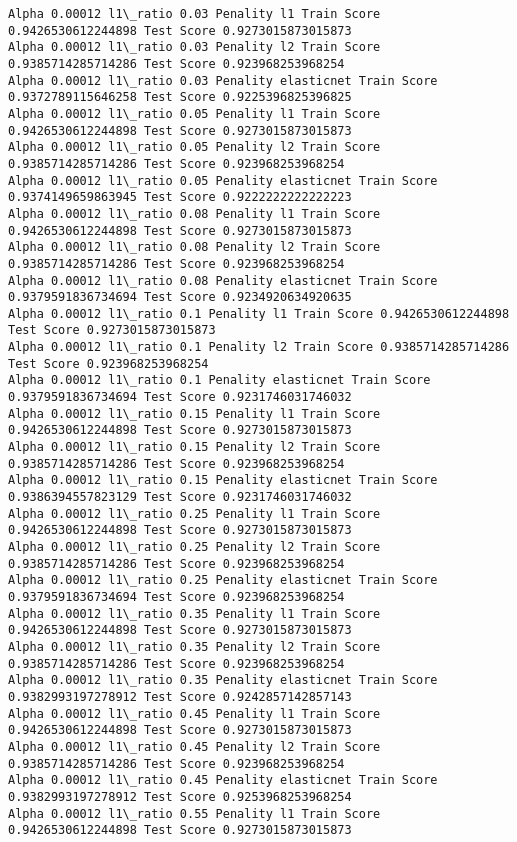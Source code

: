 \documentclass[11pt]{article}
\begin{document}
\begin{Verbatim}[commandchars=\\\{\}]
Alpha 0.00012 l1\_ratio 0.03 Penality l1 Train Score 0.9426530612244898 Test Score 0.9273015873015873
Alpha 0.00012 l1\_ratio 0.03 Penality l2 Train Score 0.9385714285714286 Test Score 0.923968253968254
Alpha 0.00012 l1\_ratio 0.03 Penality elasticnet Train Score 0.9372789115646258 Test Score 0.9225396825396825
Alpha 0.00012 l1\_ratio 0.05 Penality l1 Train Score 0.9426530612244898 Test Score 0.9273015873015873
Alpha 0.00012 l1\_ratio 0.05 Penality l2 Train Score 0.9385714285714286 Test Score 0.923968253968254
Alpha 0.00012 l1\_ratio 0.05 Penality elasticnet Train Score 0.9374149659863945 Test Score 0.9222222222222223
Alpha 0.00012 l1\_ratio 0.08 Penality l1 Train Score 0.9426530612244898 Test Score 0.9273015873015873
Alpha 0.00012 l1\_ratio 0.08 Penality l2 Train Score 0.9385714285714286 Test Score 0.923968253968254
Alpha 0.00012 l1\_ratio 0.08 Penality elasticnet Train Score 0.9379591836734694 Test Score 0.9234920634920635
Alpha 0.00012 l1\_ratio 0.1 Penality l1 Train Score 0.9426530612244898 Test Score 0.9273015873015873
Alpha 0.00012 l1\_ratio 0.1 Penality l2 Train Score 0.9385714285714286 Test Score 0.923968253968254
Alpha 0.00012 l1\_ratio 0.1 Penality elasticnet Train Score 0.9379591836734694 Test Score 0.9231746031746032
Alpha 0.00012 l1\_ratio 0.15 Penality l1 Train Score 0.9426530612244898 Test Score 0.9273015873015873
Alpha 0.00012 l1\_ratio 0.15 Penality l2 Train Score 0.9385714285714286 Test Score 0.923968253968254
Alpha 0.00012 l1\_ratio 0.15 Penality elasticnet Train Score 0.9386394557823129 Test Score 0.9231746031746032
Alpha 0.00012 l1\_ratio 0.25 Penality l1 Train Score 0.9426530612244898 Test Score 0.9273015873015873
Alpha 0.00012 l1\_ratio 0.25 Penality l2 Train Score 0.9385714285714286 Test Score 0.923968253968254
Alpha 0.00012 l1\_ratio 0.25 Penality elasticnet Train Score 0.9379591836734694 Test Score 0.923968253968254
Alpha 0.00012 l1\_ratio 0.35 Penality l1 Train Score 0.9426530612244898 Test Score 0.9273015873015873
Alpha 0.00012 l1\_ratio 0.35 Penality l2 Train Score 0.9385714285714286 Test Score 0.923968253968254
Alpha 0.00012 l1\_ratio 0.35 Penality elasticnet Train Score 0.9382993197278912 Test Score 0.9242857142857143
Alpha 0.00012 l1\_ratio 0.45 Penality l1 Train Score 0.9426530612244898 Test Score 0.9273015873015873
Alpha 0.00012 l1\_ratio 0.45 Penality l2 Train Score 0.9385714285714286 Test Score 0.923968253968254
Alpha 0.00012 l1\_ratio 0.45 Penality elasticnet Train Score 0.9382993197278912 Test Score 0.9253968253968254
Alpha 0.00012 l1\_ratio 0.55 Penality l1 Train Score 0.9426530612244898 Test Score 0.9273015873015873

\end{Verbatim}
\end{document}
